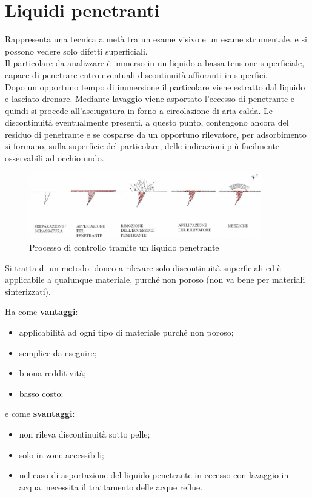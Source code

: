 \section{Liquidi penetranti}

Rappresenta una tecnica a metà tra un esame visivo e un esame strumentale, e si possono vedere solo difetti superficiali.\\
Il particolare da analizzare è immerso in un liquido a bassa tensione superficiale, capace di penetrare entro eventuali discontinuità affioranti in superfici.\\
Dopo un opportuno tempo di immersione il particolare viene estratto dal liquido e lasciato drenare. Mediante lavaggio viene asportato l’eccesso di penetrante e quindi si procede all’asciugatura in forno a circolazione di aria calda. Le discontinuità eventualmente presenti, a questo punto, contengono ancora del residuo di penetrante e se cosparse da un opportuno rilevatore, per adsorbimento si formano, sulla superficie del particolare, delle indicazioni più facilmente osservabili ad occhio nudo.
\begin{figure}[hb]
    \includegraphics[width=0.9\textwidth]{images/img15.png}
    \caption{Processo di controllo tramite un liquido penetrante}
\end{figure}

Si tratta di un metodo idoneo a rilevare solo discontinuità superficiali ed è applicabile a qualunque materiale, purché non poroso (non va bene per materiali sinterizzati).

Ha come \textbf{vantaggi}:
\begin{itemize}
    \item applicabilità ad ogni tipo di materiale purché non poroso;
    \item semplice da eseguire;
    \item buona redditività;
    \item basso costo;
\end{itemize}

e come \textbf{svantaggi}:
\begin{itemize}
    \item non rileva discontinuità sotto pelle;
    \item solo in zone accessibili;
    \item nel caso di asportazione del liquido penetrante in eccesso con lavaggio in acqua, necessita il trattamento delle acque reflue.
\end{itemize}


